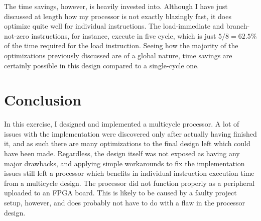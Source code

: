 \documentclass[11pt]{article}
\begin{document}
The time savings, however, is heavily invested into. Although I have
just discussed at length how my processor is not exactly blazingly
fast, it does optimize quite well for individual instructions. The
load-immediate and branch-not-zero instructions, for instance, execute
in five cycle, which is just $5/8 = 62.5\%$ of the time required for
the load instruction. Seeing how the majority of the optimizations
previously discussed are of a global nature, time savings are
certainly possible in this design compared to a single-cycle one.

\section{Conclusion}
\label{sec:conclusion}
In this exercise, I designed and implemented a multicycle processor. A
lot of issues with the implementation were discovered only after
actually having finished it, and as such there are many optimizations
to the final design left which could have been made. Regardless, the
design itself was not exposed as having any major drawbacks, and
applying simple workarounds to fix the implementation issues still
left a processor which benefits in individual instruction execution
time from a multicycle design. The processor did not function properly
as a peripheral uploaded to an FPGA board. This is likely to be caused
by a faulty project setup, however, and does probably not have to do
with a flaw in the processor design.
\end{document}
